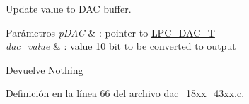 Update value to D\+AC buffer. 


\begin{DoxyParams}{Parámetros}
{\em p\+D\+AC} & \+: pointer to \hyperlink{struct_l_p_c___d_a_c___t}{L\+P\+C\+\_\+\+D\+A\+C\+\_\+T} \\
\hline
{\em dac\+\_\+value} & \+: value 10 bit to be converted to output \\
\hline
\end{DoxyParams}
\begin{DoxyReturn}{Devuelve}
Nothing 
\end{DoxyReturn}


Definición en la línea 66 del archivo dac\+\_\+18xx\+\_\+43xx.\+c.

